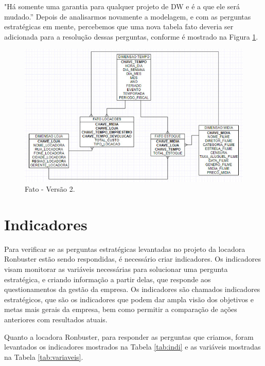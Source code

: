 "Há somente uma garantia para qualquer projeto de DW 
e é a que ele será mudado.” Depois de analisarmos 
novamente a modelagem, e com as perguntas estratégicas 
em mente, percebemos que uma nova tabela fato deveria ser 
adicionada para a resolução dessas perguntas, conforme é mostrado na Figura
 \ref{fig:fato}. 

\begin{figure}[!htb]
   \centering
   \caption{Fato - Versão 2.}\label{fig:fato} 
   \includegraphics[scale=0.5]{imagens/fato-1.jpeg}
\end{figure}

 
\chapter{Indicadores}

Para verificar se as perguntas estratégicas 
levantadas no projeto da locadora Ronbuster 
estão sendo respondidas, é necessário criar indicadores. 
Os indicadores visam monitorar as variáveis necessárias para 
solucionar uma pergunta estratégica, e criando informação a partir 
delas, que responde aos questionamentos da gestão da empresa. 
Os indicadores são chamados indicadores estratégicos, que são os 
indicadores que podem dar ampla visão dos objetivos e metas mais 
gerais da empresa, bem como permitir a comparação de ações anteriores 
com resultados atuais. 

Quanto a locadora Ronbuster, para responder as perguntas que criamos, 
foram levantados os indicadores mostrados na Tabela \ref{tab:indi} e as 
variáveis mostradas na Tabela \ref{tab:variaveis}.

